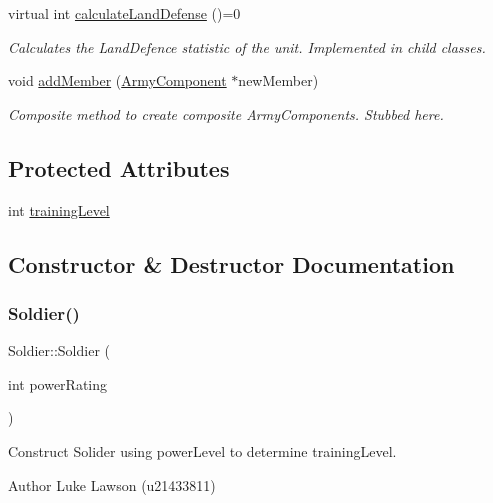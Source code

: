 \begin{DoxyCompactItemize}
virtual int \mbox{\hyperlink{class_soldier_ab37165b4ce8fbe4a24a759c81ece58c4}{calculate\+Land\+Defense}} ()=0
\begin{DoxyCompactList}\small\item\em Calculates the Land\+Defence statistic of the unit. Implemented in child classes. \end{DoxyCompactList}\item 
void \mbox{\hyperlink{class_soldier_af158cf7ebb1fbf27d4b46c272de60803}{add\+Member}} (\mbox{\hyperlink{class_army_component}{Army\+Component}} $\ast$new\+Member)
\begin{DoxyCompactList}\small\item\em Composite method to create composite Army\+Components. Stubbed here. \end{DoxyCompactList}\end{DoxyCompactItemize}
\subsection*{Protected Attributes}
\begin{DoxyCompactItemize}
\item 
int \mbox{\hyperlink{class_soldier_ac140271761bd8022e68a70f5ca3984b8}{training\+Level}}
\end{DoxyCompactItemize}


\subsection{Constructor \& Destructor Documentation}
\mbox{\label{class_soldier_a9663ed35af797ad340b1270e8f77d2a6}} 
\subsubsection{\texorpdfstring{Soldier()}{Soldier()}}
{\footnotesize\ttfamily Soldier\+::\+Soldier (\begin{DoxyParamCaption}\item[{int}]{power\+Rating }\end{DoxyParamCaption})}



Construct Solider using power\+Level to determine training\+Level. 

\begin{DoxyAuthor}{Author}
Luke Lawson (u21433811) 
\end{DoxyAuthor}

